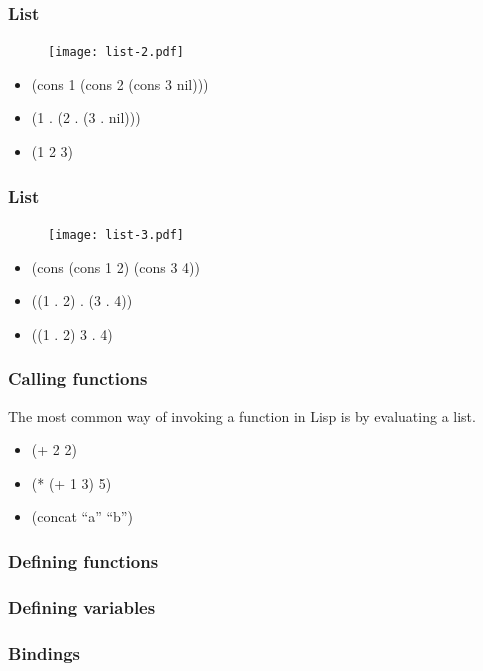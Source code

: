 \documentclass[16pt]{beamer}
\begin{document}
\begin{frame}
  \frametitle{List}
  \begin{figure}
    \texttt{[image: list-2.pdf]}
  \end{figure}
  \begin{itemize}
  \item (cons 1 (cons 2 (cons 3 nil)))
  \item (1 . (2 . (3 . nil)))
  \item (1 2 3)
  \end{itemize}
\end{frame}

\begin{frame}
  \frametitle{List}
  \begin{figure}
    \texttt{[image: list-3.pdf]}
  \end{figure}
  \begin{itemize}
  \item (cons (cons 1 2) (cons 3 4))
  \item ((1 . 2) . (3 . 4))
  \item ((1 . 2) 3 . 4)
  \end{itemize}
\end{frame}

\begin{frame}
  \frametitle{Calling functions}
  \begin{block}{}
    The most common way of invoking a function in Lisp is by
    evaluating a list.
  \end{block}
  \begin{itemize}
  \item (+ 2 2)
  \item (* (+ 1 3) 5)
  \item (concat ``a'' ``b'')
  \end{itemize}
\end{frame}

\begin{frame}
  \frametitle{Defining functions}
\end{frame}

\begin{frame}
  \frametitle{Defining variables}
\end{frame}

\begin{frame}
  \frametitle{Bindings}
\end{frame}
\end{document}

